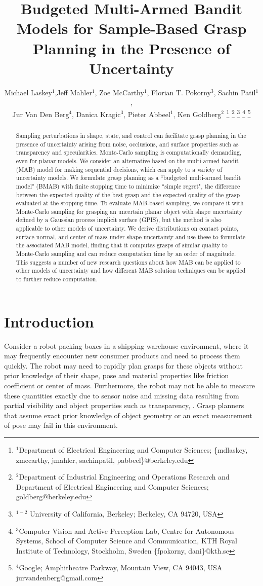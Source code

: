 \documentclass[letterpaper, 10 pt, conference]{ieeeconf}  %
\title{\LARGE \bf
Budgeted Multi-Armed Bandit Models for Sample-Based Grasp Planning in the Presence of Uncertainty}
\author{Michael Laskey$^1$,Jeff Mahler$^1$, Zoe McCarthy$^1$,  Florian T. Pokorny$^3$, Sachin Patil$^1$,\\ Jur Van Den Berg$^4$,  Danica Kragic$^3$, Pieter Abbeel$^1$, Ken Goldberg$^2$%
\thanks{$^1$Department of Electrical Engineering and Computer Sciences; {\small \{mdlaskey, zmccarthy, jmahler, sachinpatil, pabbeel\}@berkeley.edu}}%
\thanks{$^2$Department of Industrial Engineering and Operations Research and Department of Electrical Engineering and Computer Sciences; {\small goldberg@berkeley.edu}}%
\thanks{$^{1-2}$ University of California, Berkeley;  Berkeley, CA 94720, USA}%
\thanks{$^3$Computer Vision and Active Perception Lab, Centre for Autonomous Systems, School of Computer Science and Communication, KTH Royal Institute of Technology, Stockholm, Sweden {\small \{fpokorny, dani\}@kth.se}}%
\thanks{$^4$Google; Amphitheatre Parkway, Mountain View, CA 94043, USA {\small jurvandenberg@gmail.com}}%
}
\begin{document}
\maketitle
\thispagestyle{empty}
\pagestyle{empty}




\begin{abstract}
Sampling perturbations in shape, state, and control can facilitate grasp planning in the presence of uncertainty arising from noise, occlusions, and surface properties such as transparency and specularities.  Monte-Carlo sampling is computationally demanding, even for planar models. We consider an alternative based on the multi-armed bandit (MAB) model for making sequential decisions, which can apply to a variety of uncertainty models.  We formulate grasp planning as a ``budgeted multi-armed bandit model" (BMAB) with finite stopping time to minimize ``simple regret", the difference between the expected quality of the best grasp and the expected quality of the grasp evaluated at the stopping time.  To evaluate MAB-based sampling, we compare it with Monte-Carlo sampling for grasping an uncertain planar object with shape uncertainty defined by a Gaussian process implicit surface (GPIS), but the method is also applicable to other models of uncertainty.  We derive distributions on contact points, surface normal, and center of mass under shape uncertainty and use these to formulate the associated MAB model, finding that it computes grasps of similar quality to Monte-Carlo sampling and can reduce computation time by an order of magnitude.  This suggests a number of new research questions about how MAB can be applied to other models of uncertainty and how different MAB solution techniques can be applied to further reduce computation.
\end{abstract}


\section{Introduction}



Consider a robot packing boxes in a shipping warehouse environment, where it may frequently encounter new consumer products and need to process them quickly.
The robot may need to rapidly plan grasps for these objects without prior knowledge of their shape, pose and material properties like friction coefficient or center of mass. 
Furthermore, the robot may not be able to measure these quantities exactly due to sensor noise and missing data resulting from partial visibility and object properties such as transparency, .
Grasp planners that assume exact prior knowledge of object geometry or an exact measurement of pose may fail in this environment.
\end{document}
